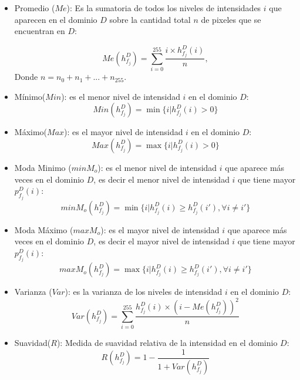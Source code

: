 \begin{itemize}
    \item Promedio ($Me$): Es la sumatoria de todos los niveles de intensidades $i$ que aparecen en el dominio $D$ sobre la cantidad total $n$ de pixeles que se encuentran en $D$:
		
\begin{equation}
\label{promedio}
   Me(h_{f_j}^D) = \sum_{i=0}^{255}\frac{i\times h_{f_j}^D(i)}{n},
\end{equation}		
Donde $n = n_0 + n_1 + ... + n_{255}$.

    \item M\'inimo($Min$): es el menor nivel de intensidad $i$ en el dominio $D$:
\begin{equation}
\label{minimo}
	Min(h_{f_j}^D) = \min\{i|h_{f_j}^D(i)>0\}
\end{equation}		
		\item M\'aximo($Max$): es el mayor nivel de intensidad $i$ en el dominio $D$:
\begin{equation}
\label{maximo}
   Max(h_{f_j}^D) = \max\{i|h_{f_j}^D(i)>0\}
\end{equation}		
 		\item Moda Minimo ($minM_o$): es el menor nivel de intensidad $i$ que aparece m\'as veces en el dominio $D$, es decir el menor nivel de intensidad $i$ que tiene mayor $p_{f_j}^{D}(i)$:
\begin{equation}
\label{ModaMinimo}
   minM_o(h_{f_j}^D) = \min\{i|h_{f_j}^D(i) \geq h_{f_j}^D(i'), \forall i\neq i'\}
\end{equation}		
\item Moda M\'aximo ($maxM_o$): es el mayor nivel de intensidad $i$ que aparece m\'as veces en el dominio $D$, es decir el mayor nivel de intensidad $i$ que tiene mayor $p_{f_j}^{D}(i)$:
\begin{equation}
\label{ModaMinimo}
   maxM_o(h_{f_j}^D) = \max\{i|h_{f_j}^D(i) \geq h_{f_j}^D(i'), \forall i\neq i'\}
\end{equation}				
    
		
		\item Varianza ($Var$): es la varianza de los niveles de intensidad $i$ en el dominio $D$:
  \begin{equation}
\label{varianza}
   Var(h_{f_j}^D) = \sum_{i=0}^{255}\frac{h_{f_j}^D(i)\times(i - Me(h_{f_j}^D))^2}{n}
\end{equation}		
		\item Suavidad($R$): Medida de suavidad relativa de la intensidad en el dominio $D$:
 \begin{equation}
\label{Suavidad}
   R(h_{f_j}^D) = 1-\frac{1}{1+Var(h_{f_j}^D)}
\end{equation}		
		

\end{itemize}


